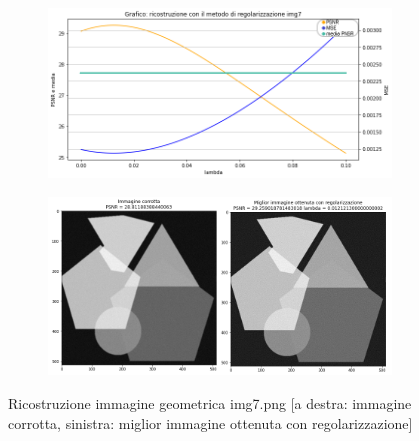 \begin{figure}[H]
    \begin{subfigure}{0.5\textwidth}
        \includegraphics[width=\textwidth]{imgRicostruzione/grafico7minimize.png}
    \end{subfigure}%
    \begin{subfigure}{0.5\textwidth}
        \centering
        \includegraphics[width=\textwidth]{imgRicostruzione/ricostruzione7minimize.png}
    \end{subfigure}
    \caption{Ricostruzione immagine geometrica img7.png [a destra: immagine corrotta, sinistra: miglior immagine ottenuta con regolarizzazione]}
\end{figure}

